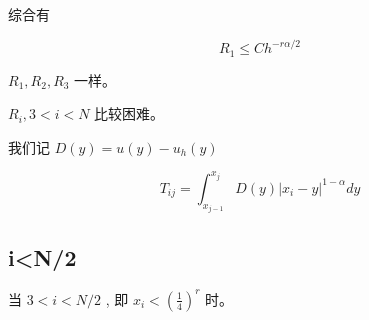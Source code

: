 \documentclass{ctexart}
\begin{document}
综合有

\begin{equation}
    R_1 \le C h^{-r\alpha/2}
\end{equation}

\(R_1, R_2, R_3\) 一样。





\newpage

\(R_i, 3<i< N\) 比较困难。


我们记 \(D(y) = u(y) - u_h(y)\)

\begin{equation}
    T_{ij} = \int_{x_{j-1}}^{x_{j}} D(y) |x_i - y|^{1-\alpha} dy
\end{equation}



\subsection{i<N/2}

当 \(3<i<N/2\) , 即 \(x_i<(\frac{1}{4})^r\) 时。
\end{document}
